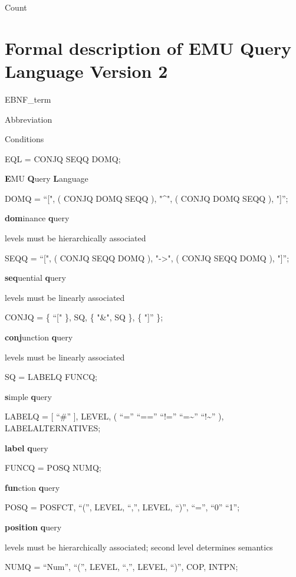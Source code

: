 \documentclass[]{book}
\begin{document}
Count

\hypertarget{formal-description-of-emu-query-language-version-2}{%
\section{Formal description of EMU Query Language Version 2}\label{formal-description-of-emu-query-language-version-2}}

EBNF\_term

Abbreviation

Conditions

EQL = CONJQ \textbar{} SEQQ \textbar{} DOMQ;

\textbf{E}MU \textbf{Q}uery \textbf{L}anguage

DOMQ = ``{[}", ( CONJQ \textbar{} DOMQ \textbar{} SEQQ ), "\^{}", ( CONJQ \textbar{} DOMQ \textbar{} SEQQ ), "{]}'';

\textbf{dom}inance \textbf{q}uery

levels must be hierarchically associated

SEQQ = ``{[}", ( CONJQ \textbar{} SEQQ \textbar{} DOMQ ), "-\textgreater{}", ( CONJQ \textbar{} SEQQ \textbar{} DOMQ ), "{]}'';

\textbf{seq}uential \textbf{q}uery

levels must be linearly associated

CONJQ = \{ ``{[}" \}, SQ, \{ "\&", SQ \}, \{ "{]}'' \};

\textbf{conj}unction \textbf{q}uery

levels must be linearly associated

SQ = LABELQ \textbar{} FUNCQ;

\textbf{s}imple \textbf{q}uery

LABELQ = {[} ``\#'' {]}, LEVEL, ( ``='' \textbar{} ``=='' \textbar{} ``!='' \textbar{} ``=\textasciitilde{}'' \textbar{} ``!\textasciitilde{}'' ), LABELALTERNATIVES;

\textbf{label} \textbf{q}uery

FUNCQ = POSQ \textbar{} NUMQ;

\textbf{fun}ction \textbf{q}uery

POSQ = POSFCT, ``('', LEVEL, ``,'', LEVEL, ``)'', ``='', ``0'' \textbar{} ``1'';

\textbf{position} \textbf{q}uery

levels must be hierarchically associated; second level determines semantics

NUMQ = ``Num'', ``('', LEVEL, ``,'', LEVEL, ``)'', COP, INTPN;
\end{document}
